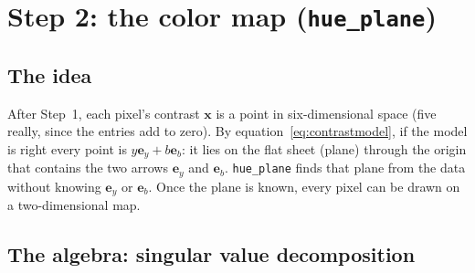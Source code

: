 \documentclass[11pt,letterpaper]{article}
\newcommand{\code}[1]{\texttt{#1}}
\newcommand{\vx}{\mathbf{x}}
\newcommand{\ey}{\mathbf{e}_y}
\newcommand{\eb}{\mathbf{e}_b}
\newcommand{\src}[3]{%
  }
\begin{document}
\section{Step 2: the color map (\code{hue\_plane})}
\label{sec:plane}

\src{288}{290}{The body of \code{hue\_plane}.}

\subsection{The idea}

After Step~1, each pixel's contrast $\vx$ is a point in six-dimensional space
(five really, since the entries add to zero).  By
equation~\eqref{eq:contrastmodel}, if the model is right every point is
$y\ey + b\eb$: it lies on the flat sheet (plane) through the origin that
contains the two arrows $\ey$ and $\eb$.  \code{hue\_plane} finds that plane
from the data without knowing $\ey$ or $\eb$.  Once the plane is known, every
pixel can be drawn on a two-dimensional map.

\subsection{The algebra: singular value decomposition}
\end{document}
